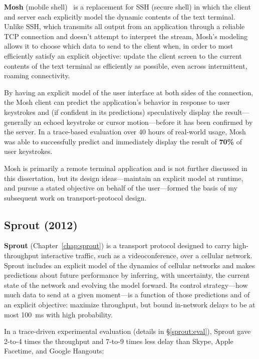 \textbf{Mosh} (mobile shell)~\cite{mosh} is a replacement for SSH
(secure shell) in which the client and server each explicitly model
the dynamic contents of the text terminal. Unlike SSH, which transmits all
output from an application through a reliable TCP connection and
doesn't attempt to interpret the stream, Mosh's modeling allows it
to choose which data to send to the client when, in order to most
efficiently satisfy an explicit objective: update the client screen to
the current contents of the text terminal as efficiently as possible,
even across intermittent, roaming connectivity.

By having an explicit model of the user interface at both sides of the
connection, the Mosh client can predict the application's behavior in
response to user keystrokes and (if confident in its predictions)
speculatively display the result---generally an echoed keystroke or
cursor motion---before it has been confirmed by the server. In a
trace-based evaluation over 40 hours of real-world usage, Mosh was
able to successfully predict and immediately display the result of
\textbf{70\%} of user keystrokes.

Mosh is primarily a remote terminal application and is not further
discussed in this dissertation, but its design ideas---maintain an
explicit model at runtime, and pursue a stated objective on behalf of
the user---formed the basis of my subsequent work on
transport-protocol design.

\subsection{Sprout (2012)}

\textbf{Sprout} (Chapter~\ref{chap:sprout}) is a transport protocol
designed to carry high-throughput interactive traffic, such as a
videoconference, over a cellular network. Sprout includes an explicit
model of the dynamics of cellular networks and makes predictions about
future performance by inferring, with uncertainty, the current state
of the network and evolving the model forward. Its control
strategy---how much data to send at a given moment---is a function of
those predictions and of an explicit objective: maximize throughput,
but bound in-network delays to be at most 100~ms with high
probability.

In a trace-driven experimental evaluation (details in
\S\ref{sprout:eval}), Sprout gave 2-to-4 times the throughput and
7-to-9 times less delay than Skype, Apple Facetime, and Google
Hangouts:

